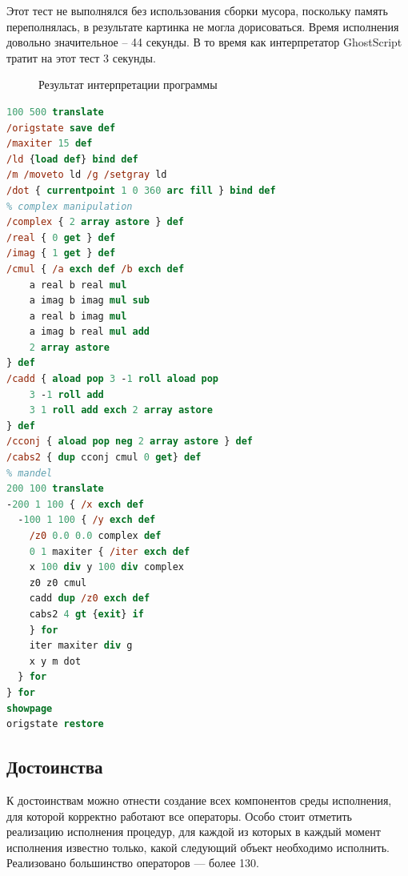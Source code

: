 \documentclass[14pt]{extarticle}
\begin{document}
Этот тест не выполнялся без использования сборки мусора, поскольку память переполнялась, в результате картинка не могла дорисоваться. Время исполнения  довольно значительное -- 44 секунды. В то время как интерпретатор GhostScript тратит на этот тест 3 секунды.

\begin{figure} [h]
\caption{Результат интерпретации программы}\label{mandelprotset}
\end{figure}

\begin{lstlisting}[label=mandel_ps,caption=Множество Мандельброта, frame = none, language = PostScript]
100 500 translate
/origstate save def
/maxiter 15 def
/ld {load def} bind def
/m /moveto ld /g /setgray ld
/dot { currentpoint 1 0 360 arc fill } bind def
% complex manipulation
/complex { 2 array astore } def
/real { 0 get } def
/imag { 1 get } def
/cmul { /a exch def /b exch def
    a real b real mul
    a imag b imag mul sub
    a real b imag mul
    a imag b real mul add
    2 array astore
} def
/cadd { aload pop 3 -1 roll aload pop
    3 -1 roll add
    3 1 roll add exch 2 array astore
} def
/cconj { aload pop neg 2 array astore } def
/cabs2 { dup cconj cmul 0 get} def
% mandel
200 100 translate
-200 1 100 { /x exch def
  -100 1 100 { /y exch def
    /z0 0.0 0.0 complex def
    0 1 maxiter { /iter exch def
    x 100 div y 100 div complex
    z0 z0 cmul
    cadd dup /z0 exch def
    cabs2 4 gt {exit} if
    } for
    iter maxiter div g
    x y m dot
  } for
} for
showpage
origstate restore
\end{lstlisting}

\subsection{Достоинства}
К достоинствам можно отнести создание всех компонентов среды исполнения, для которой корректно работают все операторы. Особо стоит отметить реализацию исполнения процедур, для каждой из которых в каждый момент исполнения известно только, какой следующий объект необходимо исполнить. Реализовано большинство операторов  --- более 130.
\end{document}
